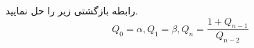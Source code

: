     \p 
رابطه بازگشتی زیر را حل نمایید.
$$Q_0 = \alpha, Q_1 = \beta, Q_n = \frac{1 + Q_{n-1}}{Q_{n-2}}$$